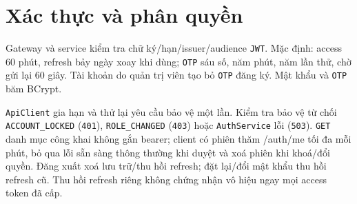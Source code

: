 \clearpage
\section{Xác thực và phân quyền}\label{sec:srs-16}
Gateway và service kiểm tra chữ ký/\allowbreak{}hạn/\allowbreak{}issuer/\allowbreak{}audience \texttt{JWT}. Mặc định: access 60 phút, refresh bảy ngày xoay khi dùng; \texttt{OTP} sáu số, năm phút, năm lần thử, chờ gửi lại 60 giây. Tài khoản do quản trị viên tạo bỏ \texttt{OTP} đăng ký. Mật khẩu và \texttt{OTP} băm BCrypt.

\texttt{Api\allowbreak{}Client} gia hạn và thử lại yêu cầu bảo vệ một lần. Kiểm tra bảo vệ từ chối \texttt{ACCOUNT\_\allowbreak{}LOCKED} (\texttt{401}), \texttt{ROLE\_\allowbreak{}CHANGED} (\texttt{403}) hoặc \texttt{Auth\allowbreak{}Service} lỗi (\texttt{503}). \texttt{GET} danh mục công khai không gắn bearer; client có phiên thăm /\allowbreak{}auth/\allowbreak{}me tối đa mỗi phút, bỏ qua lỗi sẵn sàng thông thường khi duyệt và xoá phiên khi khoá/\allowbreak{}đổi quyền. Đăng xuất xoá lưu trữ/\allowbreak{}thu hồi refresh; đặt lại/\allowbreak{}đổi mật khẩu thu hồi refresh cũ. Thu hồi refresh riêng không chứng nhận vô hiệu ngay mọi access token đã cấp.
